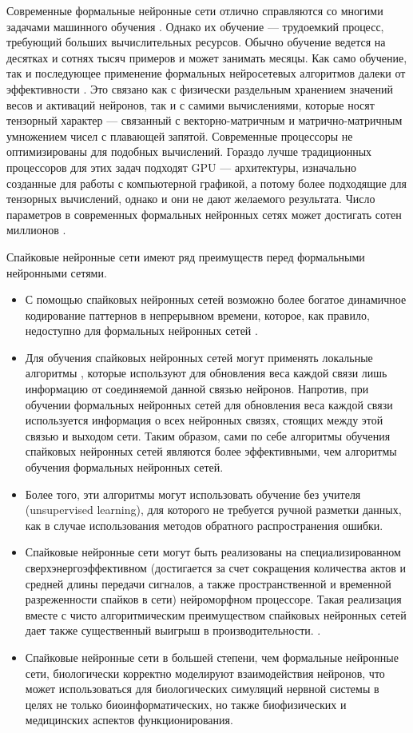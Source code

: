 \documentclass[a4paper]{article}
\begin{document}
Современные формальные нейронные сети отлично справляются со многими задачами машинного обучения \cite{pmlr-v28-wan13, Khan_2020}. Однако их обучение --- трудоемкий процесс, требующий больших вычислительных ресурсов. Обычно обучение ведется на десятках и сотнях тысяч примеров и может занимать месяцы. Как само обучение, так и последующее применение формальных нейросетевых алгоритмов далеки от эффективности \cite{Edwards2015GrowingPF}. Это связано как с физически раздельным хранением значений весов и активаций нейронов, так и с самими вычислениями, которые носят тензорный характер --- связанный с векторно-матричным и матрично-матричным умножением чисел с плавающей запятой. Современные процессоры не оптимизированы для подобных вычислений. Гораздо лучше традиционных процессоров для этих задач подходят GPU --- архитектуры, изначально созданные для работы с компьютерной графикой, а потому более подходящие для тензорных вычислений, однако и они не дают желаемого результата. Число параметров в современных формальных нейронных сетях может достигать сотен миллионов \cite{ManyParams, Khan_2020}.

Спайковые нейронные сети имеют ряд преимуществ перед формальными нейронными сетями.

\begin{itemize}
\item С помощью спайковых нейронных сетей возможно более богатое динамичное кодирование паттернов в непрерывном времени, которое, как правило, недоступно для формальных нейронных сетей \cite{Ismail_Fawaz_2019}.
\item Для обучения спайковых нейронных сетей могут применять локальные алгоритмы \cite{STDP, pehlevan2019spiking, Baldi_2016}, которые используют для обновления веса каждой связи лишь информацию от соединяемой данной связью нейронов. Напротив, при обучении формальных нейронных сетей для обновления веса каждой связи используется информация о всех нейронных связях, стоящих между этой связью и выходом сети. Таким образом, сами по себе алгоритмы обучения спайковых нейронных сетей являются более эффективными, чем алгоритмы обучения формальных нейронных сетей.
\item Более того, эти алгоритмы могут использовать обучение без учителя (unsupervised learning), для которого не требуется ручной разметки данных, как в случае использования методов обратного распространения ошибки.
\item Спайковые нейронные сети могут быть реализованы на специализированном сверхэнергоэффективном (достигается за счет сокращения количества актов и средней длины передачи сигналов, а также пространственной и временной разреженности спайков в сети) нейроморфном процессоре. Такая реализация вместе с чисто алгоритмическим преимуществом спайковых нейронных сетей дает также существенный выигрыш в производительности. \cite{hardware1, hardware2}. 
\item Спайковые нейронные сети в большей степени, чем формальные нейронные сети, биологически корректно моделируют взаимодействия нейронов, что может использоваться для биологических симуляций нервной системы в целях не только биоинформатических, но также биофизических и медицинских аспектов функционирования.
\end{itemize}
\end{document}
